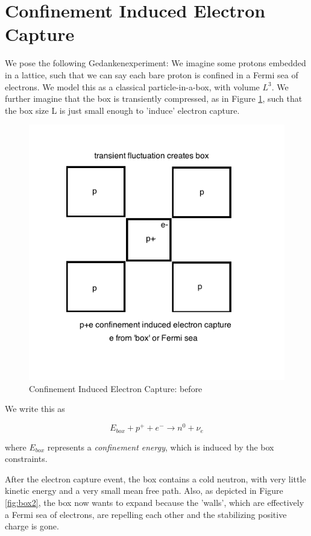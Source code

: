\documentclass[%
 aip,
 jmp,%
 amsmath,amssymb,
 reprint,%
]{revtex4-1}
\begin{document}
\section{Confinement Induced Electron Capture}

We pose the following Gedankenexperiment:   We imagine some protons embedded in a lattice, such that we can say each bare proton is confined in a Fermi sea of electrons. We model this as a classical particle-in-a-box, with volume $L^3$.   We further imagine that the box is transiently compressed, as in Figure \ref{fig:box1}, such that the box size L is just small enough to  'induce' electron capture.  

\begin{figure}
   \includegraphics[scale=0.5]{img/box-before.png}
   \caption{Confinement Induced Electron Capture: before}
  \label{fig:box1}
\end{figure}

We write this as

$$E_{box}+p^{+}+e^{-}\rightarrow n^{0}+\nu_{e}$$

where $E_{box}$ represents a \emph{confinement energy}, which is induced by the box constraints. 

After the electron capture event, the box contains a cold neutron, with very little kinetic energy and a very small mean free path.  Also, as depicted in Figure \ref{fig:box2}, the box now wants to expand because the 'walls', which are effectively a Fermi sea of electrons, are repelling each other and the stabilizing positive charge is gone.
\end{document}
